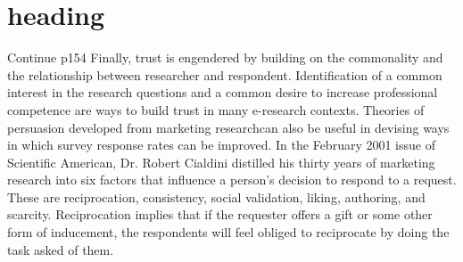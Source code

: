 \documentclass{beamer}
\begin{document}
\section{ heading}
\begin{frame}{Continue p154}
Finally, trust is engendered by building on the commonality and the relationship between researcher and respondent. 
Identification of a common interest in the research questions and a common desire to increase professional competence are
ways to build trust in many e-research contexts. 
Theories of persuasion developed from marketing researchcan also be useful in devising ways in which survey response rates can be improved.
In the February 2001 issue of Scientific American, Dr. Robert Cialdini distilled his thirty years of marketing research 
into six factors that influence a person's decision to respond to a request. These are reciprocation, consistency, social validation, 
liking, authoring, and scarcity. Reciprocation implies that if the requester offers a gift or some other form of inducement, 
the respondents will feel obliged to reciprocate by doing the task asked of them.
\end{frame}
\end{document}
